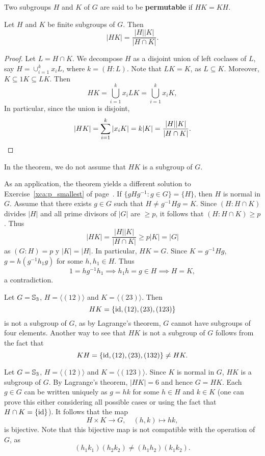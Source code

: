 Two subgroups $H$ and $K$ of $G$ are said to be
\textbf{permutable} if $HK=KH$.

\begin{theorem}
\label{thm:|HK|}
    Let $H$ and $K$ be finite subgroups of $G$. 
    Then 
    \[
        |HK|=\frac{|H||K|}{|H\cap K|}.
    \]
\end{theorem}

\begin{proof}
Let $L=H\cap K$.
We decompose $H$ as a disjoint union of left coclases of $L$, say 
$H=\cup_{i=1}^k x_iL$, where $k=(H:L)$. Note that $LK=K$, as $L\subseteq K$. Moreover, $K\subseteq 1K\subseteq LK$.
Then
\[
HK=\bigcup_{i=1}^k x_iLK=\bigcup_{i=1}^k x_iK,
\]
In particular, since the union is disjoint, 
\[
|HK|=\sum_{i=1}^k |x_iK|=k|K|=\frac{|H||K|}{|H\cap K|}.\qedhere
\]
\end{proof}

In the theorem, we do not assume that $HK$ is a subgroup of $G$. 

As an application, the theorem yields a different solution to Exercise~\ref{xca:p_smallest} of page~\pageref{xca:p_smallest}. 
If $\{gHg^{-1}:g\in G\}=\{H\}$, then $H$ is normal in $G$. Assume that
there exists $g\in G$ such that
$H\ne g^{-1}Hg=K$. Since $(H:H\cap K)$ divides $|H|$ 
and all prime divisors of $|G|$ 
are $\geq p$, it follows that $(H:H\cap K)\geq p$. Thus 
\[
|HK|=\frac{|H||K|}{|H\cap K|}\geq p|K|=|G|
\]
as $(G:H)=p$ y $|K|=|H|$. In particular, $HK=G$. Since $K=g^{-1}Hg$, 
$g=h(g^{-1}h_1g)$ for some $h,h_1\in H$. Thus 
\[
1=hg^{-1}h_1\implies h_1h=g\in H\implies H=K,
\]
a contradiction.

\begin{example}
Let $G=\mathbb{S}_3$, $H=\langle (12)\rangle$ and $K=\langle (23)\rangle$. Then 
\[
HK=\{\operatorname{id},(12),(23),(123)\}
\]
is not a subgroup of $G$, as by Lagrange's theorem, 
$G$ cannot have subgroups of four elements. Another way 
to see that $HK$ is not a subgroup of $G$ follows from 
the fact that 
\[
KH=\{\operatorname{id},(12),(23),(132)\}\ne HK.
\]
\end{example}

\begin{example}
Let $G=\mathbb{S}_3$, $H=\langle (12)\rangle$ and $K=\langle (123)\rangle$.
Since $K$ is normal in $G$, $HK$ is a subgroup of $G$. By Lagrange's theorem, $|HK|=6$ and hence $G=HK$.
Each $g\in G$ can be written uniquely as $g=hk$ for some $h\in H$ and $k\in K$ (one can prove this either considering all possible cases or 
using the fact that $H\cap K=\{\operatorname{id}\}$). It follows that the map 
\[
H\times K\to G,\quad
(h,k)\mapsto hk,
\]
is bijective. Note that this bijective map is not compatible 
with the operation of $G$, as 
\[
(h_1k_1)(h_2k_2)\ne (h_1h_2)(k_1k_2).
\]
\end{example}

